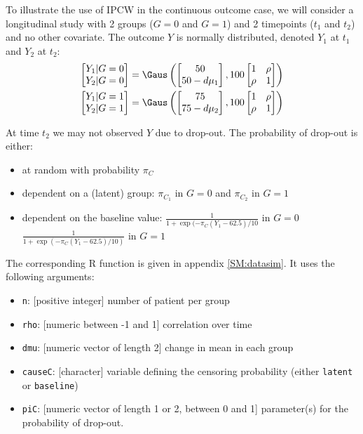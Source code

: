 \documentclass[12pt]{article}
\begin{document}
To illustrate the use of IPCW in the continuous outcome case, we will
consider a longitudinal study with 2 groups (\(G=0\) and \(G=1\)) and
2 timepoints (\(t_1\) and \(t_2\)) and no other covariate. The outcome
\(Y\) is normally distributed, denoted \(Y_1\) at \(t_1\) and \(Y_2\)
at \(t_2\):
\begin{align*}
\begin{bmatrix}
Y_1 | G=0 \\ Y_2 |G=0
\end{bmatrix} &= \Gaus\left(
\begin{bmatrix}
50 \\ 50-d\mu_1
\end{bmatrix},100 \begin{bmatrix}
1 & \rho \\ \rho & 1
\end{bmatrix}
\right) \\
\begin{bmatrix}
Y_1 | G=1 \\ Y_2 |G=1
\end{bmatrix} &= \Gaus\left(
\begin{bmatrix}
75 \\ 75-d\mu_2
\end{bmatrix},100 \begin{bmatrix}
1 & \rho \\ \rho & 1
\end{bmatrix}
\right)
\end{align*}

At time \(t_2\) we may not observed \(Y\) due to drop-out. The
probability of drop-out is either:
\begin{itemize}
\item at random with probability \(\pi_C\)
\item dependent on a (latent) group: \(\pi_{C_1}\) in \(G=0\) and \(\pi_{C_2}\) in \(G=1\)
\item dependent on the baseline value: \(\frac{1}{1+\exp(-\pi_{C}(Y_1-62.5)/10}\) in \(G=0\) \newline \hphantom{on the basleine value:} \(\frac{1}{1+\exp(-\pi_{C}(Y_1-62.5)/10)}\) in \(G=1\)
\end{itemize}

\bigskip

The corresponding R function is given in appendix \ref{SM:datasim}. It uses
the following arguments:
\begin{itemize}
\item \texttt{n}: [positive integer] number of patient per group
\item \texttt{rho}: [numeric between -1 and 1] correlation over time
\item \texttt{dmu}: [numeric vector of length 2] change in mean in each group
\item \texttt{causeC}: [character] variable defining the censoring probability \newline (either \texttt{latent} or \texttt{baseline})
\item \texttt{piC}: [numeric vector of length 1 or 2, between 0 and 1] parameter(s) for the probability of drop-out.
\end{itemize}
\end{document}
